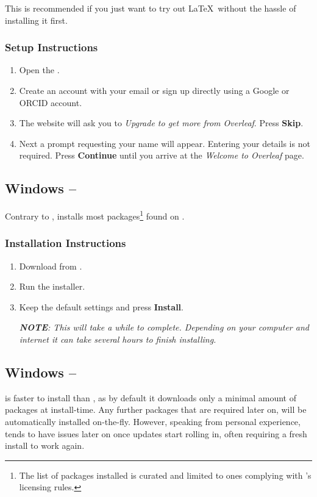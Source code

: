This is recommended if you just want to try out \LaTeX\ without the hassle of installing it first.

\subsubsection{Setup Instructions}
\begin{enumerate}
    \item Open the .
    \item Create an account with your email or sign up directly using a Google or ORCID account.
    \item The website will ask you to \textit{Upgrade to get more from Overleaf}. Press \textbf{Skip}.
    \item Next a prompt requesting your name will appear. Entering your details is not required. Press \textbf{Continue} until you arrive at the \textit{Welcome to Overleaf} page.
\end{enumerate}


\subsection{Windows -- }
Contrary to ,  installs most packages\footnote{The list of packages installed is curated and limited to ones complying with 's licensing rules.} found on .


\subsubsection{Installation Instructions}
\begin{enumerate}
    \item Download  from .
    \item Run the installer.
    \item Keep the default settings and press \textbf{Install}.

        \textit{\textbf{NOTE}: This will take a while to complete.
            Depending on your computer and internet it can take several hours to finish installing.}
\end{enumerate}


\subsection{Windows -- }
 is faster to install than , as by default it downloads only a minimal amount of packages at install-time. 
Any further packages that are required later on, will be automatically installed on-the-fly.
However, speaking from personal experience,  tends to have issues later on once updates start rolling in, often requiring a fresh install to work again.


